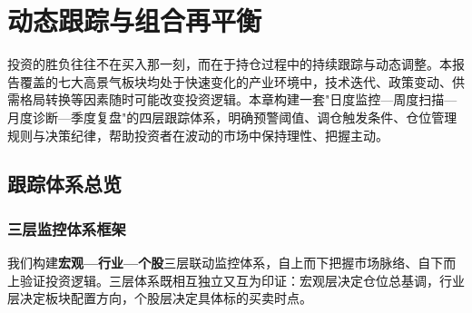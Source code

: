 
\chapter{动态跟踪与组合再平衡}

投资的胜负往往不在买入那一刻，而在于持仓过程中的持续跟踪与动态调整。本报告覆盖的七大高景气板块均处于快速变化的产业环境中，技术迭代、政策变动、供需格局转换等因素随时可能改变投资逻辑。本章构建一套"日度监控—周度扫描—月度诊断—季度复盘"的四层跟踪体系，明确预警阈值、调仓触发条件、仓位管理规则与决策纪律，帮助投资者在波动的市场中保持理性、把握主动。

\section{跟踪体系总览}

\subsection{三层监控体系框架}

我们构建\textbf{宏观—行业—个股}三层联动监控体系，自上而下把握市场脉络、自下而上验证投资逻辑。三层体系既相互独立又互为印证：宏观层决定仓位总基调，行业层决定板块配置方向，个股层决定具体标的买卖时点。

